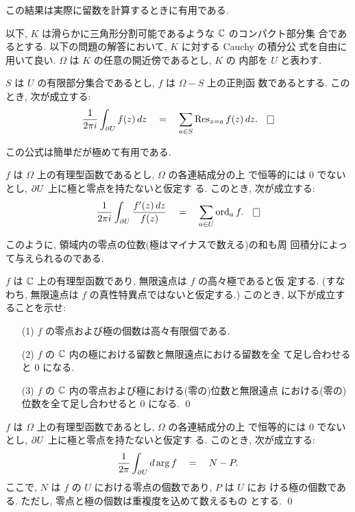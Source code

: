 \documentclass[12pt,twoside]{jarticle}
\begin{document}
\noindent この結果は実際に留数を計算するときに有用である.

以下, $K$ は滑らかに三角形分割可能であるような ${\mathbb C}$ のコンパクト部分集
合であるとする. 以下の問題の解答において, $K$ に対する Cauchy の積分公
式を自由に用いて良い. $\Omega$ は $K$ の任意の開近傍であるとし, $K$ の
内部を $U$ と表わす.

\begin{question}\qstar{*}
  $S$ は $U$ の有限部分集合であるとし, $f$ は $\Omega - S$ 上の正則函
  数であるとする. このとき, 次が成立する:
  \[%
    \frac{1}{2\pi i} \int_{\del U} f(z)\,dz
    \quad = \quad
    \sum_{a\in S} \Res_{z=a} f(z)\,dz.
  \qed
  \]%
\end{question}

\noindent この公式は簡単だが極めて有用である.

\begin{question}\qstar{*}
  $f$ は $\Omega$ 上の有理型函数であるとし, $\Omega$ の各連結成分の上
  で恒等的には $0$ でないとし, $\partial U$ 上に極と零点を持たないと仮定す
  る. このとき, 次が成立する:
  \[%
    \frac{1}{2\pi i} \int_{\del U} \frac{f'(z)\,dz}{f(z)}
    \quad = \quad
    \sum_{a\in U} \ord_a f.
  \qed 
  \]%
\end{question}

\noindent このように, 領域内の零点の位数(極はマイナスで数える)の和も周
回積分によって与えられるのである. 

\begin{question}\qstar{*}
  $f$ は ${\mathbb C}$ 上の有理型函数であり, 無限遠点は $f$ の高々極であると仮
  定する. (すなわち, 無限遠点は $f$ の真性特異点ではないと仮定する.) 
  このとき, 以下が成立することを示せ:
  \begin{enumerate}
  \item[(1)] $f$ の零点および極の個数は高々有限個である.
  \item[(2)] $f$ の ${\mathbb C}$ 内の極における留数と無限遠点における留数を全
    て足し合わせると $0$ になる.
  \item[(3)] $f$ の ${\mathbb C}$ 内の零点および極における(零の)位数と無限遠点
    における(零の)位数を全て足し合わせると $0$ になる.
    \qed
  \end{enumerate}
\end{question}

\begin{question}[偏角の原理]
  $f$ は $\Omega$ 上の有理型函数であるとし, $\Omega$ の各連結成分の上
  で恒等的には $0$ でないとし, $\partial U$ 上に極と零点を持たないと仮定す
  る. このとき, 次が成立する:
  \[
    \frac{1}{2\pi}\int_{\partial U} d\arg f
    \quad = \quad
    N - P.
  \]
  ここで, $N$ は $f$ の $U$ における零点の個数であり, $P$ は $U$ にお
  ける極の個数である. ただし, 零点と極の個数は重複度を込めて数えるもの
  とする. \qed
\end{question}
\end{document}
